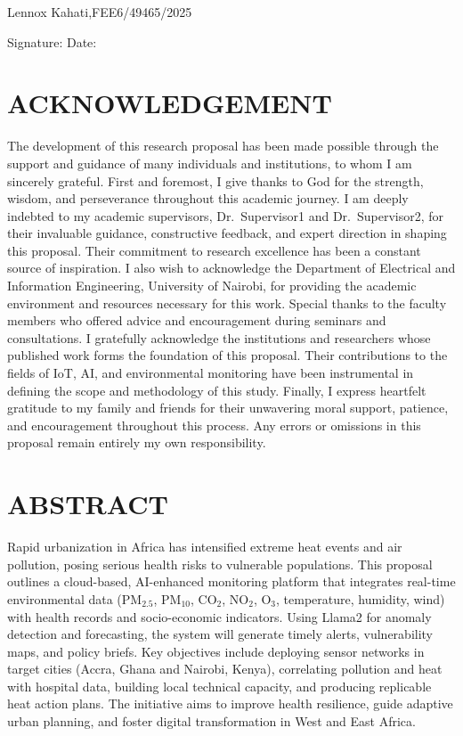 \documentclass[12pt,a4paper]{report}
\newcommand{\sigline}[1][6cm]{\underline{\hspace{#1}}}
\begin{document}
\vspace{1cm}
Lennox Kahati,\quad FEE6/49465/2025

\vspace{0.7cm}
\noindent
Signature: \sigline[8cm]\qquad Date: \sigline[4cm]

\chapter*{ACKNOWLEDGEMENT}
The development of this research proposal has been made possible through the support and guidance of many individuals and institutions, to whom I am sincerely grateful. First and foremost, I give thanks to God for the strength, wisdom, and perseverance throughout this academic journey. I am deeply indebted to my academic supervisors, Dr.~Supervisor1 and Dr.~Supervisor2, for their invaluable guidance, constructive feedback, and expert direction in shaping this proposal. Their commitment to research excellence has been a constant source of inspiration. I also wish to acknowledge the Department of Electrical and Information Engineering, University of Nairobi, for providing the academic environment and resources necessary for this work. Special thanks to the faculty members who offered advice and encouragement during seminars and consultations. I gratefully acknowledge the institutions and researchers whose published work forms the foundation of this proposal. Their contributions to the fields of IoT, AI, and environmental monitoring have been instrumental in defining the scope and methodology of this study. Finally, I express heartfelt gratitude to my family and friends for their unwavering moral support, patience, and encouragement throughout this process. Any errors or omissions in this proposal remain entirely my own responsibility.

\tableofcontents
\listoffigures
\listoftables



\chapter*{ABSTRACT}
Rapid urbanization in Africa has intensified extreme heat events and air pollution, posing serious health risks to vulnerable populations. This proposal outlines a cloud-based, AI-enhanced monitoring platform that integrates real-time environmental data (PM$_{2.5}$, PM$_{10}$, CO$_2$, NO$_2$, O$_3$, temperature, humidity, wind) with health records and socio-economic indicators. Using Llama2 for anomaly detection and forecasting, the system will generate timely alerts, vulnerability maps, and policy briefs. Key objectives include deploying sensor networks in target cities (Accra, Ghana and Nairobi, Kenya), correlating pollution and heat with hospital data, building local technical capacity, and producing replicable heat action plans. The initiative aims to improve health resilience, guide adaptive urban planning, and foster digital transformation in West and East Africa.
\end{document}
